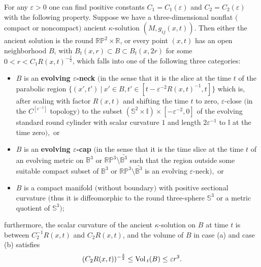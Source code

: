 \begin{theorem}
  \label{thm:cz-ancient-kappa-canonical-neighborhoods}
 For any $\varepsilon>0$ one can find
positive constants $C_1=C_1(\varepsilon)$ and
$C_2=C_2(\varepsilon)$ with the following property. Suppose we
have a three-dimensional nonflat $($compact or noncompact$)$
ancient $\kappa$-solution $(M,g_{ij}(x,t))$. Then either the
ancient solution is the round $\mathbb{R}\mathbb{P}^2 \times
\mathbb{R}$, or every point $(x,t)$ has an open neighborhood $B$,
with $B_t(x,r)\subset B \subset B_t(x,2r)$ for some
$0<r<C_1R(x,t)^{-\frac{1}{2}}$, which falls into one of the
following three categories:
\begin{itemize}
\item[(a)] $B$ is an {\bf evolving $\varepsilon$-neck} $($in the
sense that it is the slice at the time $t$ of the parabolic region
$\{(x',t')\ |\ x' \in B, t' \in [t - \varepsilon^{-2}R(x,t)^{-1},
t] \}$ which is, after scaling with factor $R(x,t)$ and shifting
the time $t$ to zero, $\varepsilon$-close $($in the
$C^{[\varepsilon^{-1}]}$ topology$)$ to the subset
$(\mathbb{S}^2\times \mathbb{I})\times [-\varepsilon^{-2},0]$ of
the evolving standard round cylinder with scalar curvature $1$ and
length $2\varepsilon^{-1}$ to $\mathbb{I}$ at the time zero$),$ or
 \item[(b)] $B$ is an {\bf
evolving $\varepsilon$-cap} $($in the sense that it is the time
slice at the time $t$ of an evolving metric on $\mathbb{B}^3$ or
$\mathbb{R}\mathbb{P}^3\setminus\bar{\mathbb{B}^3}$ such that the
region outside some suitable compact subset of $\mathbb{B}^3$ or
$\mathbb{R}\mathbb{P}^3\setminus\bar{\mathbb{B}^3}$ is an evolving
$\varepsilon$-neck$),$ or 
\item[(c)] $B$ is a compact manifold $($without boundary$)$ with
positive sectional curvature $($thus it is diffeomorphic to the
round three-sphere $\mathbb{S}^3$ or a metric quotient of
$\mathbb{S}^3);$
\end{itemize}
furthermore, the scalar curvature of the ancient $\kappa$-solution
on $B$ at time $t$ is between $C_2^{-1}R(x,t)$ and $C_2R(x,t)$,
and the volume of $B$ in case {\rm (a)} and case {\rm (b)}
satisfies
$$
(C_2R(x,t))^{-\frac{3}{2}} \leq {\rm Vol}\,_t(B) \leq \varepsilon r^3.
$$
\end{theorem}

